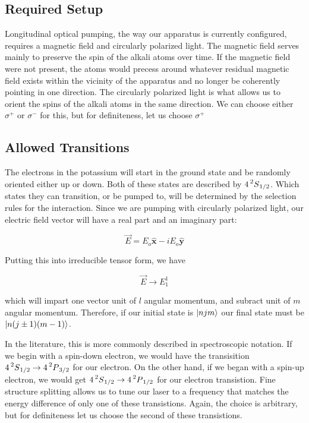 \documentclass[12pt]{article}
\newcommand{\xhat}{\hat{\textbf{x}}}
\newcommand{\yhat}{\hat{\textbf{y}}}
\begin{document}
	\subsection{Required Setup}
    Longitudinal optical pumping, the way our apparatus is 
    currently configured, requires a magnetic field and
    circularly polarized light. The magnetic field
	serves mainly to preserve the spin of the alkali
	atoms over time. If the magnetic field were not 
	present, the atoms would precess around whatever
	residual magnetic field exists within the vicinity
	of the apparatus and no longer be coherently pointing
	in one direction. The circularly polarized light
	is what allows us to orient the spins of the alkali
	atoms in the same direction. We can choose either 
	$\sigma^{+}$ or $\sigma^{-}$ for this, but for 
	definiteness, let us choose $\sigma^{+}$

	\subsection{Allowed Transitions}
	The electrons in the potassium will start in the ground
	state and be randomly oriented either up or down.
	Both of these states are described by 
	$4\prescript{2}{}S_{1/2}$.
	Which states they can transition, or be pumped to, 
	will be determined by the selection
	rules for the interaction. Since we are pumping with
	circularly polarized light, our electric field vector
	will have a real part and an imaginary part:
	
	\begin{equation}
		\vec{E}=E_o \xhat  -iE_o \yhat 
	\end{equation}

	Putting this into irreducible tensor form, we have 

	\begin{equation}
		\vec{E} \rightarrow E_{1}^1
	\end{equation}

	which will impart one vector unit of $l$ angular momentum,
	and subract unit of $m$ angular momentum. Therefore, if
	our initial state is $\ket{njm}$ our final state must
	be $\ket{n(j\pm1)(m-1)}$. 	

	In the literature, this is more
	commonly described in spectroscopic notation. If we begin 
	with a spin-down electron, we would have the transisition
	$4\prescript{2}{}S_{1/2} \rightarrow 4\prescript{2}{}P_{3/2}$
	for our electron.
	On the other hand, if we began with a spin-up electron, we 
	would get 
	$4\prescript{2}{}S_{1/2} \rightarrow 4\prescript{2}{}P_{1/2}$
	for our electron transistion. Fine structure splitting 
	allows us to tune our laser to a frequency that matches 
	the energy difference of only one of these transistions. 
	Again, the choice is arbitrary, but for definiteness let us
	choose the second of these transistions. 
\end{document}
